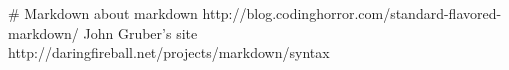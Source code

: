 # Markdown
about markdown
http://blog.codinghorror.com/standard-flavored-markdown/
John Gruber's site
http://daringfireball.net/projects/markdown/syntax
